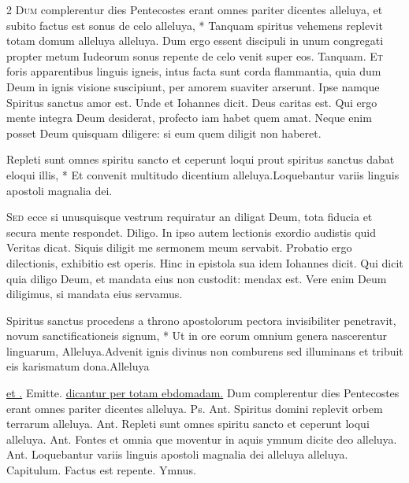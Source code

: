 \begin{multicols*}{2}
\lettrine[lines=2]{\zallmancaps \color{Red} D}{um} \hypertarget{dum-complerentur-dies}{\label{dum-complerentur-dies}} complerentur dies Pentecostes erant omnes pariter dicentes alleluya, et subito factus est sonus de celo alleluya, * Tanquam spiritus vehemens replevit totam domum alleluya alleluya. \V Dum ergo essent discipuli in unum congregati propter metum Iudeorum sonus repente de celo venit super eos. Tanquam. 
\lettrine[lines=2]{\zallmancaps \color{Blue} E}{t} foris apparentibus linguis igneis, intus facta sunt corda flammantia, quia dum Deum in ignis visione suscipiunt, per amorem suaviter arserunt. Ipse namque Spiritus sanctus amor est. Unde et Iohannes dicit. Deus caritas est. Qui ergo mente integra Deum desiderat, profecto iam habet quem amat. Neque enim posset Deum quisquam diligere: si eum quem diligit non haberet.
\begin{responsory}
{Repleti sunt omnes spiritu sancto et ceperunt loqui prout spiritus sanctus dabat eloqui illis, * Et convenit multitudo dicentium alleluya.}{Loquebantur variis linguis apostoli magnalia dei.}
\end{responsory}%
\lettrine[lines=2]{\zallmancaps \color{Red} S}{ed} ecce si unusquisque vestrum requiratur an diligat Deum, tota fiducia et secura mente respondet. Diligo. In ipso autem lectionis exordio audistis quid Veritas dicat. Siquis diligit me sermonem meum servabit. Probatio ergo dilectionis, exhibitio est operis. Hinc in epistola sua idem Iohannes dicit. Qui dicit quia diligo Deum, et mandata eius non custodit: mendax est. Vere enim Deum diligimus, si mandata eius servamus.
\begin{responsory-final}
{Spiritus sanctus procedens a throno apostolorum pectora invisibiliter penetravit, novum sanctificationeis signum, * Ut in ore eorum omnium genera nascerentur linguarum, Alleluya.}{Advenit ignis divinus non comburens sed illuminans et tribuit eis karismatum dona.}{Alleluya}
\end{responsory-final}%
 \ul{et \Vbar .} Emitte. \ul{dicantur per totam ebdomadam.}
 Dum complerentur dies Pentecostes erant omnes pariter dicentes alleluya. {\color{Red} Ps.}  {\color{Red} Ant.} Spiritus domini replevit orbem terrarum alleluya. {\color{Red} Ant.} Repleti sunt omnes spiritu sancto et ceperunt loqui alleluya. {\color{Red} Ant.} Fontes et omnia que moventur in aquis ymnum dicite deo alleluya. {\color{Red} Ant.} Loquebantur variis linguis apostoli magnalia dei alleluya alleluya. {\color{Red} Capitulum.} Factus est repente. {\color{Red} Ymnus.}

\end{multicols*}
